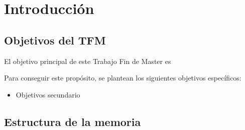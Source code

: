 \chapter{Introducción}
\label{chap:intro}

\section{Objetivos del TFM} 
\label{chap:objetivos}
El objetivo principal de este Trabajo Fin de Master es  

Para conseguir este propósito, se plantean los siguientes objetivos específicos:
\begin{itemize}
\item Objetivos secundario
\end{itemize}

\section{Estructura de la memoria}
\label{chap:estructura}
